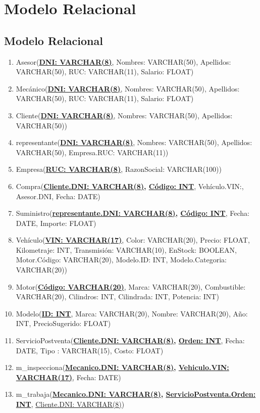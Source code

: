 \documentclass[12pt]{article}
\begin{document}
\section{Modelo Relacional}

\subsection{Modelo Relacional}
\begin{enumerate}
\item Asesor(\textbf{\underline{DNI: VARCHAR(8)}}, Nombres: VARCHAR(50), Apellidos: VARCHAR(50), RUC: VARCHAR(11), Salario: FLOAT)
\item Mecánico(\textbf{\underline{DNI: VARCHAR(8)}}, Nombres: VARCHAR(50), Apellidos: VARCHAR(50), RUC: VARCHAR(11), Salario: FLOAT)
\item Cliente(\textbf{\underline{DNI: VARCHAR(8)}}, Nombres: VARCHAR(50), Apellidos: VARCHAR(50))
\item representante(\textbf{\underline{DNI: VARCHAR(8)}}, Nombres: VARCHAR(50), Apellidos: VARCHAR(50), Empresa.RUC: VARCHAR(11))
\item Empresa(\textbf{\underline{RUC: VARCHAR(8)}}, RazonSocial: VARCHAR(100))
\item Compra(\textbf{\underline{Cliente.DNI: VARCHAR(8)}, \underline{Código: INT}}, Vehículo.VIN:, Asesor.DNI, Fecha: DATE)
\item Suministro(\textbf{\underline{representante.DNI: VARCHAR(8)}, \underline{Código: INT}}, Fecha: DATE, Importe: FLOAT)
\item Vehículo(\textbf{\underline{VIN: VARCHAR(17)}}, Color: VARCHAR(20), Precio: FLOAT, Kilometraje: INT, Transmisión: VARCHAR(10), EnStock: BOOLEAN, Motor.Código: VARCHAR(20), Modelo.ID: INT, Modelo.Categoria: VARCHAR(20))
\item Motor(\textbf{\underline{Código: VARCHAR(20)}}, Marca: VARCHAR(20), Combustible: VARCHAR(20), Cilindros: INT, Cilindrada: INT, Potencia: INT)
\item Modelo(\textbf{\underline{ID: INT}}, Marca: VARCHAR(20), Nombre: VARCHAR(20), Año: INT, PrecioSugerido: FLOAT)
\item ServicioPostventa(\textbf{\underline{Cliente.DNI: VARCHAR(8)}, \underline{Orden: INT}}, Fecha: DATE, Tipo : VARCHAR(15), Costo: FLOAT)
\item m\_inspecciona(\textbf{\underline{Mecanico.DNI: VARCHAR(8)}, \underline{Vehiculo.VIN: VARCHAR(17)}}, Fecha: DATE)
\item m\_trabaja(\textbf{\underline{Mecanico.DNI: VARCHAR(8)}, \underline{ServicioPostventa.Orden: INT}}, \underline{Cliente.DNI: VARCHAR(8)})
\end{enumerate}
\end{document}
